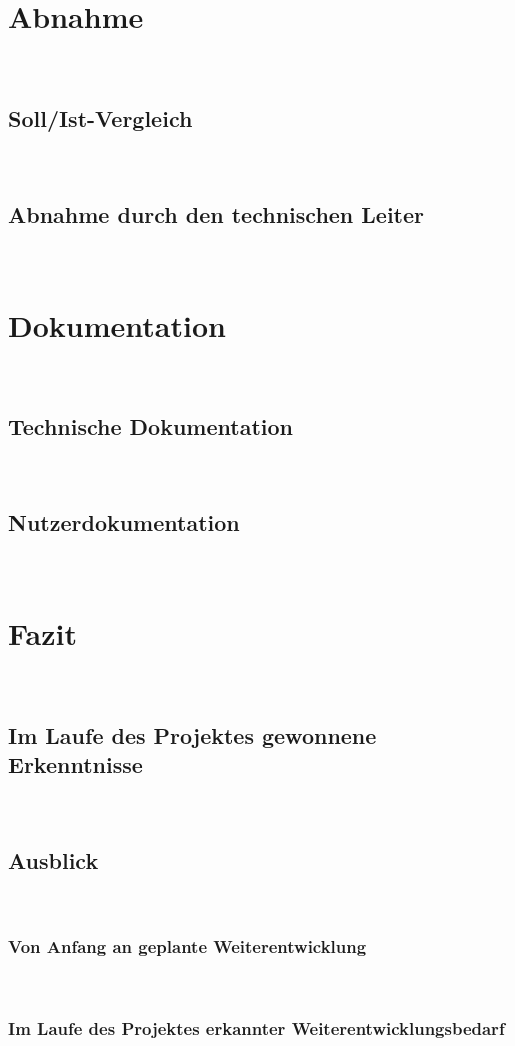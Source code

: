 \documentclass[11pt,toc=sectionentrywithoutdots, headheight=44pt, headings=optiontoheadandtoc]{scrartcl}
\begin{document}
\section{Abnahme}
\blindtext\

\subsection{Soll/Ist-Vergleich}
\blindtext\

\subsection{Abnahme durch den technischen Leiter}
\blindtext\

\section{Dokumentation}
\blindtext\

\subsection{Technische Dokumentation}
\blindtext\

\subsection{Nutzerdokumentation}
\blindtext\

\section{Fazit}
\blindtext\

\subsection{Im Laufe des Projektes gewonnene Erkenntnisse}
\blindtext\

\subsection{Ausblick}
\blindtext\

\subsubsection{Von Anfang an geplante Weiterentwicklung}
\blindtext\

\subsubsection{Im Laufe des Projektes erkannter Weiterentwicklungsbedarf}
\blindtext\
\end{document}
